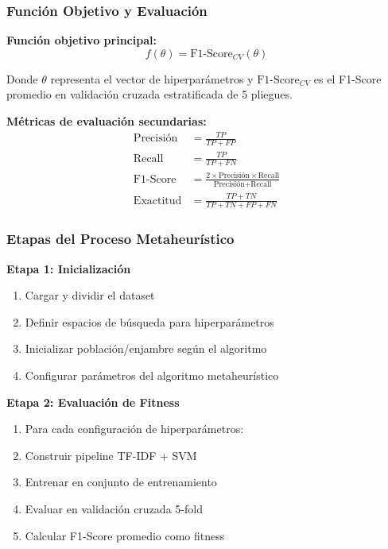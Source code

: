 \subsubsection{Función Objetivo y Evaluación}

\textbf{Función objetivo principal:}
\begin{equation}
f(\theta) = \text{F1-Score}_{CV}(\theta)
\end{equation}

Donde $\theta$ representa el vector de hiperparámetros y $\text{F1-Score}_{CV}$ es el F1-Score promedio en validación cruzada estratificada de 5 pliegues.

\textbf{Métricas de evaluación secundarias:}
\begin{align}
\text{Precisión} &= \frac{TP}{TP + FP} \\
\text{Recall} &= \frac{TP}{TP + FN} \\
\text{F1-Score} &= \frac{2 \times \text{Precisión} \times \text{Recall}}{\text{Precisión} + \text{Recall}} \\
\text{Exactitud} &= \frac{TP + TN}{TP + TN + FP + FN}
\end{align}

\subsubsection{Etapas del Proceso Metaheurístico}

\textbf{Etapa 1: Inicialización}
\begin{enumerate}
    \item Cargar y dividir el dataset
    \item Definir espacios de búsqueda para hiperparámetros
    \item Inicializar población/enjambre según el algoritmo
    \item Configurar parámetros del algoritmo metaheurístico
\end{enumerate}

\textbf{Etapa 2: Evaluación de Fitness}
\begin{enumerate}
    \item Para cada configuración de hiperparámetros:
    \item \quad Construir pipeline TF-IDF + SVM
    \item \quad Entrenar en conjunto de entrenamiento
    \item \quad Evaluar en validación cruzada 5-fold
    \item \quad Calcular F1-Score promedio como fitness
\end{enumerate}

